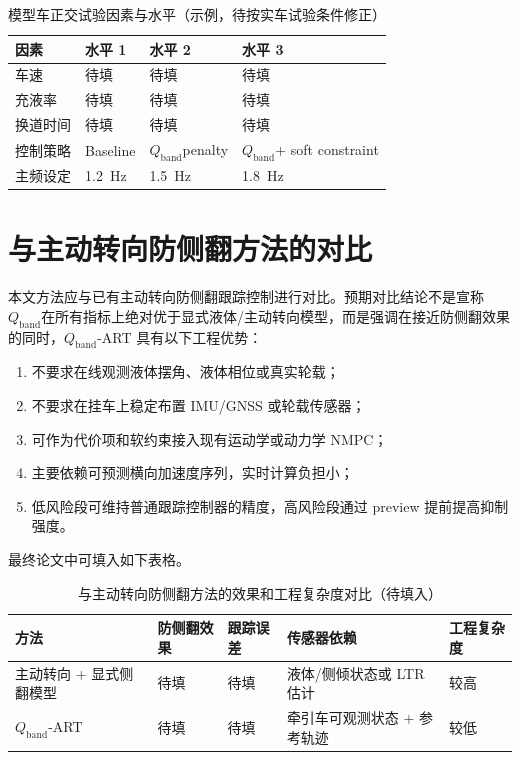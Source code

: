 \documentclass[UTF8,zihao=-4]{ctexrep}
\newcommand{\Qband}{$Q_{\mathrm{band}}$}
\begin{document}
\begin{table}[htbp]
\centering
\caption{模型车正交试验因素与水平（示例，待按实车试验条件修正）}
\begin{tabular}{llll}
\toprule
因素 & 水平 1 & 水平 2 & 水平 3\\
\midrule
车速 & 待填 & 待填 & 待填\\
充液率 & 待填 & 待填 & 待填\\
换道时间 & 待填 & 待填 & 待填\\
控制策略 & Baseline & \Qband penalty & \Qband + soft constraint\\
主频设定 & \SI{1.2}{Hz} & \SI{1.5}{Hz} & \SI{1.8}{Hz}\\
\bottomrule
\end{tabular}
\end{table}

\section{与主动转向防侧翻方法的对比}
本文方法应与已有主动转向防侧翻跟踪控制进行对比。预期对比结论不是宣称 \Qband 在所有指标上绝对优于显式液体/主动转向模型，而是强调在接近防侧翻效果的同时，\Qband-ART 具有以下工程优势：
\begin{enumerate}[label=(\arabic*)]
  \item 不要求在线观测液体摆角、液体相位或真实轮载；
  \item 不要求在挂车上稳定布置 IMU/GNSS 或轮载传感器；
  \item 可作为代价项和软约束接入现有运动学或动力学 NMPC；
  \item 主要依赖可预测横向加速度序列，实时计算负担小；
  \item 低风险段可维持普通跟踪控制器的精度，高风险段通过 preview 提前提高抑制强度。
\end{enumerate}
最终论文中可填入如下表格。

\begin{table}[htbp]
\centering
\caption{与主动转向防侧翻方法的效果和工程复杂度对比（待填入）}
\begin{tabularx}{\linewidth}{lXXXX}
\toprule
方法 & 防侧翻效果 & 跟踪误差 & 传感器依赖 & 工程复杂度\\
\midrule
主动转向 + 显式侧翻模型 & 待填 & 待填 & 液体/侧倾状态或 LTR 估计 & 较高\\
\Qband-ART & 待填 & 待填 & 牵引车可观测状态 + 参考轨迹 & 较低\\
\bottomrule
\end{tabularx}
\end{table}
\end{document}
